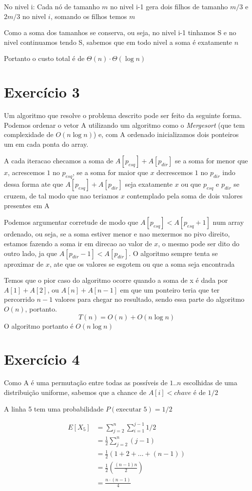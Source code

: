 \documentclass[a4paper,12pt]{article}
\begin{document}
No nivel i: Cada nó de tamanho $m$ no nivel i-1 gera dois filhos de tamanho $m/3$ e $2m/3$ no nivel $i$, somando os filhos temos $m$

Como a soma dos tamanhos se conserva, ou seja, no nivel i-1 tinhamos S e no nivel continuamos tendo S, sabemos que em todo nivel a soma é exatamente $n$

Portanto o custo total é de $\Theta(n) \cdot \Theta(\log{n})$

\section*{Exercício 3}
Um algoritmo que resolve o problema descrito pode ser feito da seguinte forma. Podemos ordenar o vetor A utilizando um algoritmo como o \textit{Mergesort} (que tem complexidade de $O(n\log{n})$) e, com A ordenado inicializamos dois ponteiros um em cada ponta do array.

A cada iteracao checamos a soma de $A[p_{esq}] + A[p_{dir}]$ se a soma for menor que $x$, acrescemos $1$ no $p_{esq}$, se a soma for maior que $x$ decrescemos $1$ no $p_{dir}$ indo dessa forma ate que $A[p_{esq}] + A[p_{dir}]$ seja exatamente $x$ ou que $p_{esq}$ e $p_{dir}$ se cruzem, de tal modo que nao teriamos $x$ contemplado pela soma de dois valores presentes em A

Podemos argumentar corretude de modo que $A[p_{esq}] < A[p_{esq} + 1]$ num array ordenado, ou seja, se a soma estiver menor e nao mexermos no pivo direito, estamos fazendo a soma ir em direcao ao valor de $x$, o mesmo pode ser dito do outro lado, ja que $A[p_{dir} - 1] < A[p_{dir}]$. O algoritmo sempre tenta se aproximar de $x$, ate que os valores se esgotem ou que a soma seja encontrada

Temos que o pior caso do algoritmo ocorre quando a soma de x é dada por $A[1] + A[2]$, ou $A[n] + A[n-1]$ em que um ponteiro teria que ter percorrido $n-1$ valores para chegar no resultado, sendo essa parte do algoritmo $O(n)$, portanto.
\begin{equation}
    T(n) = O(n) + O(n\log{n})
\end{equation}
O algoritmo portanto é $O(n\log{n})$

\section*{Exercício 4}
Como A é uma permutação entre todas as possíveis de $1..n$ escolhidas de uma distribuição uniforme, sabemos que a chance de $A[i] < chave$ é de $1/2$

A linha 5 tem uma probabilidade $P(\text{executar 5}) = 1/2$

\begin{align}
    E[X_5]
    &= \sum_{j=2}^n \sum_{i=1}^{j-1} 1/2 \\
    &= \frac{1}{2}\sum_{j=2}^n (j-1) \\
    &= \frac{1}{2}(1 + 2 + \dots + (n-1)) \\
    &= \frac{1}{2}(\frac{(n-1)n}{2}) \\
    &= \frac{n \cdot (n-1)}{4} 
\end{align}
\end{document}
